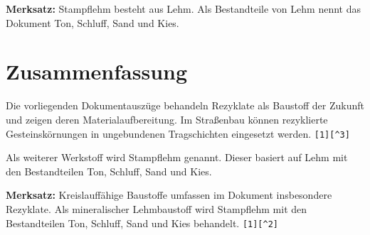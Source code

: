 \documentclass[
  12pt,
  a4paper,
  oneside
]{scrreprt}
\newcommand{\quelle}[1]{\hfill\texttt{#1}}
\begin{document}
\begin{merksatzbox}
\textbf{Merksatz:}
Stampflehm besteht aus Lehm. Als Bestandteile von Lehm nennt das
Dokument Ton, Schluff, Sand und Kies.

\end{merksatzbox}

\section{Zusammenfassung}

Die vorliegenden Dokumentauszüge behandeln Rezyklate als Baustoff der
Zukunft und zeigen deren Materialaufbereitung. Im Straßenbau können
rezyklierte Gesteinskörnungen in ungebundenen Tragschichten eingesetzt
werden. \quelle{[1][^3]}

Als weiterer Werkstoff wird Stampflehm genannt. Dieser basiert auf Lehm
mit den Bestandteilen Ton, Schluff, Sand und Kies.


\begin{merksatzbox}
\textbf{Merksatz:}
Kreislauffähige Baustoffe umfassen im Dokument insbesondere Rezyklate.
Als mineralischer Lehmbaustoff wird Stampflehm mit den Bestandteilen
Ton, Schluff, Sand und Kies behandelt.
\quelle{[1][^2]}
\end{merksatzbox}
\end{document}
